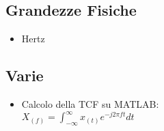     \subsection{Grandezze Fisiche}\label{Grandezze Fisiche}
        \begin{itemize}
            \item {Hertz}
        \end{itemize}

    \subsection{Varie}\label{Varie}
        \begin{itemize}
            \item {
                Calcolo della TCF su MATLAB:\\
                $X_{(f)} = \int_{-\infty}^{\infty} x_{(t)} e^{-j2\pi ft } dt$

}
\end{itemize}
